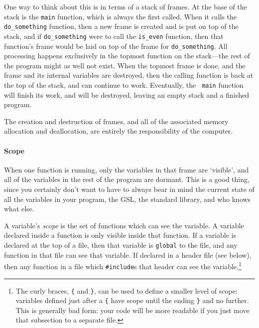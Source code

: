 \documentclass[12pt]{article}
\begin{document}
One way to think about this is in terms of a stack of frames. At the
base of the stack is the {\tt main} function, which is always the first
called. When it calls the {\tt do\_something} function, then a new frame
is created and is put on top of the stack, and if {\tt do\_something}
were to call the {\tt is\_even} function, then that function's frame would be laid on top
of the frame for {\tt do\_something}. All processing happens exclusively in
the topmost function on the stack---the rest of the program might as
well not exist. When the topmost frame is done, and the frame and its
internal variables are destroyed, then the calling function is back at
the top of the stack, and can continue to work. Eventually, the {\tt
main} function will finish its work, and will be destroyed, leaving an
empty stack and a finished program.

The creation and destruction of frames, and all of the associated
memory allocation and deallocation, are entirely the responsibility of
the computer.   

\paragraph{Scope}	\label{scope}

When one function is running, only the variables in that frame are
`visible', and all of the variables in the rest of the program are 
dormant.  This is a good thing, since you certainly don't want to have
to always bear in mind the current state of  all the variables in your program,
the GSL, the standard library, and who knows what else.

A variable's {\sl scope} is the set of functions which can see the
variable. A variable declared inside a function is only visible inside
that function.  If a variable is declared at the top of a file, then
that variable is {\tt global} to the file, and any function in that
file can see that variable. If declared in a header file (see below),
then any function in a file which {\tt \#include}s that header  can see
the variable.\footnote{The curly braces, {\tt \{} and {\tt \}}, can be
used to define a smaller level of scope: variables defined just after a
{\tt \{} have scope until the ending {\tt \}} and no further. This is
generally bad form: your code will be more readable if you just move
that subsection to a separate file.}
\end{document}
